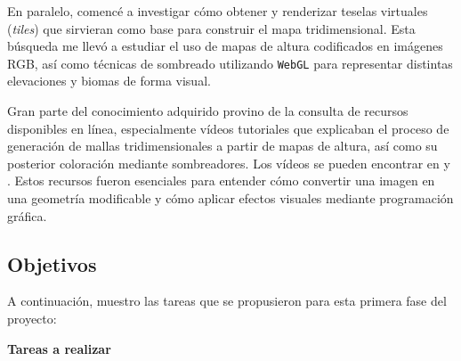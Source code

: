 \documentclass[a4paper, 12pt]{book}
\begin{document}
En paralelo, comencé a investigar cómo obtener y renderizar teselas virtuales (\textit{tiles}) que sirvieran como base para construir el mapa tridimensional. Esta búsqueda me llevó a estudiar el uso de mapas de altura codificados en imágenes RGB, así como técnicas de sombreado utilizando \texttt{WebGL} para representar distintas elevaciones y biomas de forma visual.

Gran parte del conocimiento adquirido provino de la consulta de recursos disponibles en línea, especialmente vídeos tutoriales que explicaban el proceso de generación de mallas tridimensionales a partir de mapas de altura, así como su posterior coloración mediante sombreadores. Los vídeos se pueden encontrar en \cite{youtube:terrain1} y \cite{youtube:terrain2}. Estos recursos fueron esenciales para entender cómo convertir una imagen en una geometría modificable y cómo aplicar efectos visuales mediante programación gráfica.

\subsection{Objetivos}
\label{subsec:objetivos-f2}

A continuación, muestro las tareas que se propusieron para esta primera fase del proyecto:

\vspace{1em}
\textbf{Tareas a realizar}
\end{document}

